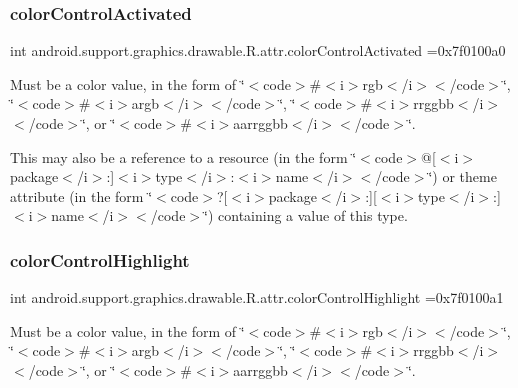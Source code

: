 \subsubsection{\texorpdfstring{color\+Control\+Activated}{colorControlActivated}}
{\footnotesize\ttfamily int android.\+support.\+graphics.\+drawable.\+R.\+attr.\+color\+Control\+Activated =0x7f0100a0\hspace{0.3cm}{\ttfamily [static]}}

Must be a color value, in the form of \char`\"{}$<$code$>$\#$<$i$>$rgb$<$/i$>$$<$/code$>$\char`\"{}, \char`\"{}$<$code$>$\#$<$i$>$argb$<$/i$>$$<$/code$>$\char`\"{}, \char`\"{}$<$code$>$\#$<$i$>$rrggbb$<$/i$>$$<$/code$>$\char`\"{}, or \char`\"{}$<$code$>$\#$<$i$>$aarrggbb$<$/i$>$$<$/code$>$\char`\"{}. 

This may also be a reference to a resource (in the form \char`\"{}$<$code$>$@\mbox{[}$<$i$>$package$<$/i$>$\+:\mbox{]}$<$i$>$type$<$/i$>$\+:$<$i$>$name$<$/i$>$$<$/code$>$\char`\"{}) or theme attribute (in the form \char`\"{}$<$code$>$?\mbox{[}$<$i$>$package$<$/i$>$\+:\mbox{]}\mbox{[}$<$i$>$type$<$/i$>$\+:\mbox{]}$<$i$>$name$<$/i$>$$<$/code$>$\char`\"{}) containing a value of this type. \mbox{\label{classandroid_1_1support_1_1graphics_1_1drawable_1_1R_1_1attr_aab1666f4e064400044e0bad85557555d}} 
\subsubsection{\texorpdfstring{color\+Control\+Highlight}{colorControlHighlight}}
{\footnotesize\ttfamily int android.\+support.\+graphics.\+drawable.\+R.\+attr.\+color\+Control\+Highlight =0x7f0100a1\hspace{0.3cm}{\ttfamily [static]}}

Must be a color value, in the form of \char`\"{}$<$code$>$\#$<$i$>$rgb$<$/i$>$$<$/code$>$\char`\"{}, \char`\"{}$<$code$>$\#$<$i$>$argb$<$/i$>$$<$/code$>$\char`\"{}, \char`\"{}$<$code$>$\#$<$i$>$rrggbb$<$/i$>$$<$/code$>$\char`\"{}, or \char`\"{}$<$code$>$\#$<$i$>$aarrggbb$<$/i$>$$<$/code$>$\char`\"{}. 

